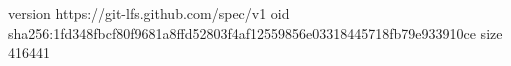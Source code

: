 version https://git-lfs.github.com/spec/v1
oid sha256:1fd348fbcf80f9681a8ffd52803f4af12559856e03318445718fb79e933910ce
size 416441
